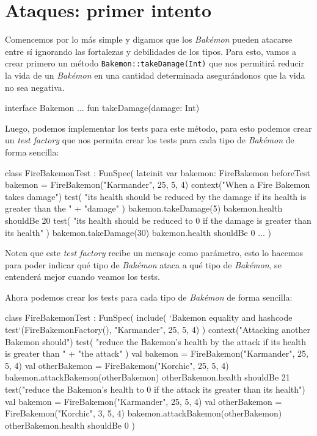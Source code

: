 \section{Ataques: primer intento}
  Comencemos por lo más simple y digamos que los \textit{Bakémon} pueden atacarse entre sí ignorando
  las fortalezas y debilidades de los tipos.
  Para esto, vamos a crear primero un método \texttt{Bakemon::takeDamage(Int)} que nos permitirá
  reducir la vida de un \textit{Bakémon} en una cantidad determinada asegurándonos que la vida no
  sea negativa.

  \begin{kotlin}
    interface Bakemon {
      ...
      fun takeDamage(damage: Int)
    }
  \end{kotlin}

  Luego, podemos implementar los tests para este método, para esto podemos crear un \textit{test 
  factory} que nos permita crear los tests para cada tipo de \textit{Bakémon} de forma sencilla:

  \begin{kotlin}
    class FireBakemonTest : FunSpec({
      lateinit var bakemon: FireBakemon
      beforeTest {
        bakemon = FireBakemon("Karmander", 25, 5, 4)
      }
      context("When a Fire Bakemon takes damage") {
        test(
          "its health should be reduced by the damage if its health is greater than the " +
              "damage"
        ) {
          bakemon.takeDamage(5)
          bakemon.health shouldBe 20
        }
        test(
          "its health should be reduced to 0 if the damage is greater than its health"
        ) {
          bakemon.takeDamage(30)
          bakemon.health shouldBe 0
        }
      }
      ...
    })
  \end{kotlin}

  Noten que este \textit{test factory} recibe un mensaje como parámetro, esto lo hacemos para poder
  indicar qué tipo de \textit{Bakémon} ataca a qué tipo de \textit{Bakémon}, se entenderá mejor
  cuando veamos los tests.

  Ahora podemos crear los tests para cada tipo de \textit{Bakémon} de forma sencilla:

  \begin{kotlin}
    class FireBakemonTest : FunSpec({
      include(
        `Bakemon equality and hashcode test`(FireBakemonFactory(), "Karmander", 25, 5, 4)
      )
      context("Attacking another Bakemon should") {
        test(
          "reduce the Bakemon's health by the attack if its health is greater than " +
              "the attack"
        ) {
          val bakemon = FireBakemon("Karmander", 25, 5, 4)
          val otherBakemon = FireBakemon("Korchic", 25, 5, 4)
          bakemon.attackBakemon(otherBakemon)
          otherBakemon.health shouldBe 21
        }
        test("reduce the Bakemon's health to 0 if the attack its greater than its health") {
          val bakemon = FireBakemon("Karmander", 25, 5, 4)
          val otherBakemon = FireBakemon("Korchic", 3, 5, 4)
          bakemon.attackBakemon(otherBakemon)
          otherBakemon.health shouldBe 0
        }
      }
    })
  \end{kotlin}

